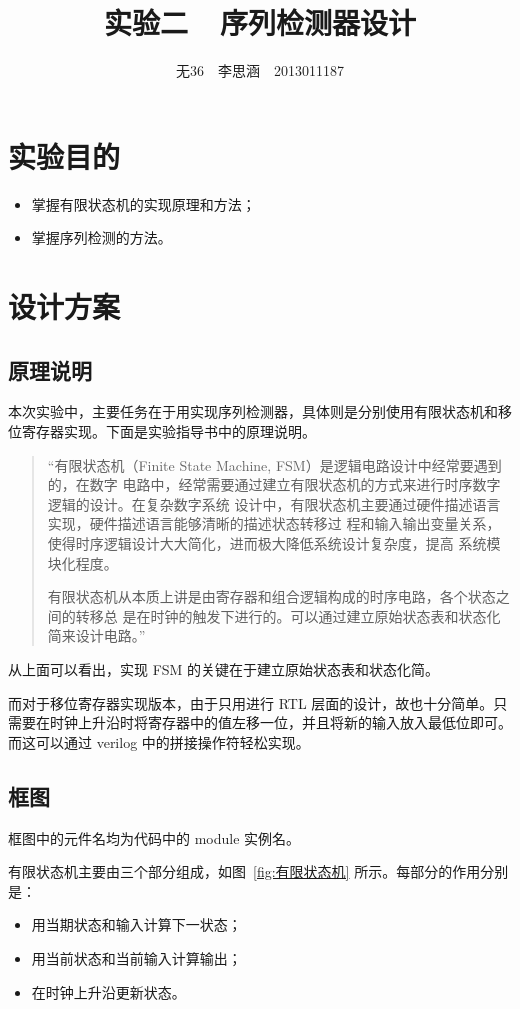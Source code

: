 \documentclass[11pt,a4paper]{article}
\begin{document}
\title{实验二\ \ 序列检测器设计}
\author{无36$\quad$李思涵$\quad$2013011187}
\maketitle

\section{实验目的}
\begin{itemize}
  \item 掌握有限状态机的实现原理和方法；
  \item 掌握序列检测的方法。
\end{itemize}

\section{设计方案}
\subsection{原理说明}
本次实验中，主要任务在于用实现序列检测器，具体则是分别使用有限状态机和移位寄存器实现。下面是实验指导书中的原理说明。

\begin{quotation}
“有限状态机（Finite State Machine, FSM）是逻辑电路设计中经常要遇到的，在数字
电路中，经常需要通过建立有限状态机的方式来进行时序数字逻辑的设计。在复杂数字系统
设计中，有限状态机主要通过硬件描述语言实现，硬件描述语言能够清晰的描述状态转移过
程和输入输出变量关系，使得时序逻辑设计大大简化，进而极大降低系统设计复杂度，提高
系统模块化程度。

有限状态机从本质上讲是由寄存器和组合逻辑构成的时序电路，各个状态之间的转移总
是在时钟的触发下进行的。可以通过建立原始状态表和状态化简来设计电路。”
\end{quotation}

从上面可以看出，实现 FSM 的关键在于建立原始状态表和状态化简。

而对于移位寄存器实现版本，由于只用进行 RTL 层面的设计，故也十分简单。只需要在时钟上升沿时将寄存器中的值左移一位，并且将新的输入放入最低位即可。而这可以通过 verilog 中的拼接操作符轻松实现。


\subsection{框图}
框图中的元件名均为代码中的 module 实例名。


有限状态机主要由三个部分组成，如图~\ref{fig:有限状态机} 所示。每部分的作用分别是：
\begin{itemize}
  \item 用当期状态和输入计算下一状态；
  \item 用当前状态和当前输入计算输出；
  \item 在时钟上升沿更新状态。
\end{itemize}
\end{document}
